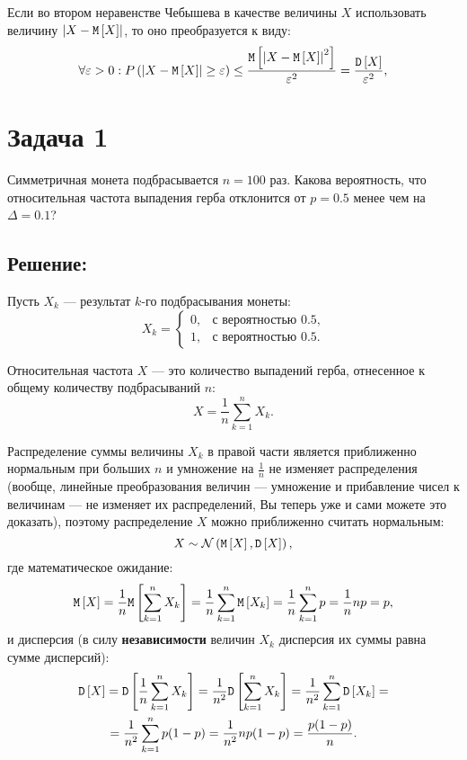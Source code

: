 Если во втором неравенстве Чебышева в качестве величины $X$ использовать величину $\left | X - \mathtt{M} \left [ X \right ] \right |$, то оно преобразуется к виду:
\begin{equation}
    \forall \varepsilon > 0 : P \left (  \left | X - \mathtt{M} \left [ X \right ] \right | \ge \varepsilon  \right ) \le \frac{\mathtt{M} \left [ \left | X - \mathtt{M} \left [ X \right ] \right |^2 \right ]}{\varepsilon^2} = \frac{\mathtt{D} \left [ X \right ]}{\varepsilon^2} ,
\end{equation}

\section*{Задача 1}

Симметричная монета подбрасывается $n=100$ раз. Какова вероятность, что относительная частота выпадения герба отклонится от $p = 0.5$ менее чем на $\Delta = 0.1$?
\subsection*{Решение:}
Пусть $X_k$ --- результат $k$-го подбрасывания монеты:
\begin{equation}
    X_k =
    \left \{
    \begin{array}{ll}
        0, & \text{с вероятностью 0.5} , \\
        1, & \text{с вероятностью 0.5} .
    \end{array}
    \right .
\end{equation}

Относительная частота $X$ --- это количество выпадений герба, отнесенное к общему количеству подбрасываний $n$:
\begin{equation}
    X = \frac{1}{n} \sum_{k=1}^n X_k .
\end{equation}

Распределение суммы величины $X_k$ в правой части является приближенно нормальным при больших $n$ и умножение на $\frac{1}{n}$ не изменяет распределения
(вообще, линейные преобразования величин --- умножение и прибавление чисел к величинам --- не изменяет их распределений, Вы теперь уже и сами можете это доказать),
поэтому распределение $X$ можно приближенно считать нормальным:
\begin{equation}
    X \sim \mathcal{N} \left ( \mathtt{M} \left [ X \right ], \mathtt{D} \left [ X \right ] \right ) ,
\end{equation}
где математическое ожидание:
\begin{equation}
    \label{1:expectation}
    \mathtt{M} \left [ X \right ]
    = \frac{1}{n} \mathtt{M} \left [ \sum_{k=1}^n X_k \right ]
    = \frac{1}{n} \sum_{k=1}^n \mathtt{M} \left [ X_k \right ]
    = \frac{1}{n} \sum_{k=1}^n p
    = \frac{1}{n} n p = p ,
\end{equation}
и дисперсия (в силу \textbf{независимости} величин $X_k$ дисперсия их суммы равна сумме дисперсий):
\begin{multline}
    \label{1:variance}
    \mathtt{D} \left [ X \right ]
    = \mathtt{D} \left [ \frac{1}{n} \sum_{k=1}^n X_k \right ]
    = \frac{1}{n^2} \mathtt{D} \left [ \sum_{k=1}^n X_k \right ]
    = \frac{1}{n^2} \sum_{k=1}^n \mathtt{D} \left [ X_k \right ] = \\
    = \frac{1}{n^2} \sum_{k=1}^n p(1-p)
    = \frac{1}{n^2} n p(1-p)
    = \frac{p(1-p)}{n} .
\end{multline}

